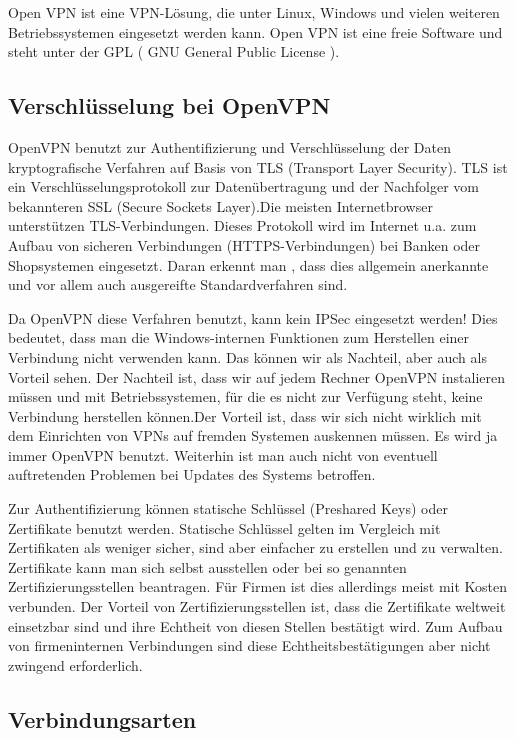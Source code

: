 \documentclass[12pt]{scrartcl}
\begin{document}
Open VPN ist eine VPN-Lösung, die unter Linux, Windows und vielen weiteren Betriebssystemen eingesetzt werden kann.
Open VPN ist eine freie Software und steht unter der GPL ( GNU General Public License ).

\subsection{Verschlüsselung bei OpenVPN}

OpenVPN benutzt zur Authentifizierung und Verschlüsselung der Daten kryptografische Verfahren auf Basis von TLS (Transport Layer Security). TLS ist ein Verschlüsselungsprotokoll zur Datenübertragung und der Nachfolger vom bekannteren SSL (Secure Sockets Layer).Die meisten Internetbrowser unterstützen TLS-Verbindungen. Dieses Protokoll wird im Internet u.a. zum Aufbau von sicheren Verbindungen  (HTTPS-Verbindungen) bei Banken oder Shopsystemen  eingesetzt. Daran erkennt man , dass dies allgemein anerkannte und vor allem auch ausgereifte  Standardverfahren sind.

Da OpenVPN diese Verfahren benutzt, kann kein IPSec eingesetzt werden! Dies bedeutet, dass man die Windows-internen Funktionen zum Herstellen einer Verbindung nicht verwenden kann. Das können wir als Nachteil, aber auch als Vorteil sehen. Der Nachteil ist, dass wir auf jedem Rechner OpenVPN instalieren müssen und mit Betriebssystemen, für die es nicht zur Verfügung steht, keine Verbindung herstellen können.Der Vorteil ist, dass wir sich nicht wirklich mit dem Einrichten von VPNs auf fremden Systemen auskennen müssen. Es wird ja immer OpenVPN benutzt. Weiterhin ist man auch nicht von eventuell auftretenden Problemen bei Updates des Systems betroffen.

Zur Authentifizierung können statische Schlüssel (Preshared Keys) oder Zertifikate benutzt werden. Statische Schlüssel gelten im Vergleich mit Zertifikaten  als weniger sicher, sind aber einfacher zu erstellen und zu verwalten. Zertifikate kann man sich selbst ausstellen oder bei so genannten Zertifizierungsstellen beantragen. Für Firmen ist dies allerdings meist mit Kosten verbunden. Der Vorteil von Zertifizierungsstellen ist, dass die Zertifikate weltweit einsetzbar sind und ihre Echtheit von diesen Stellen bestätigt wird. Zum Aufbau von firmeninternen Verbindungen sind diese Echtheitsbestätigungen aber nicht zwingend erforderlich.

\subsection{Verbindungsarten}
\end{document}
